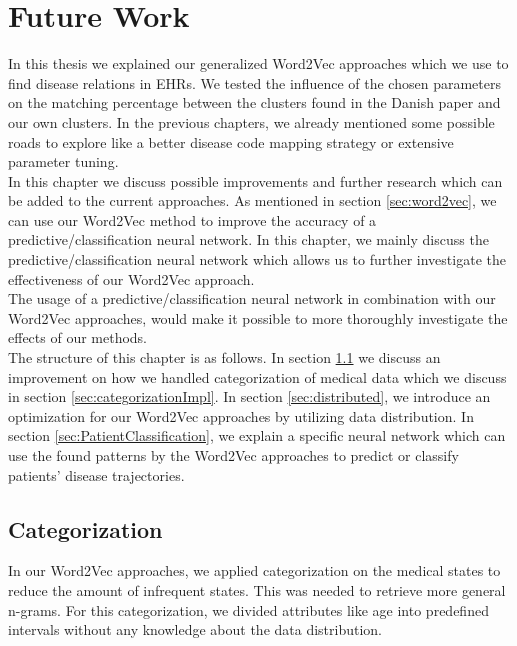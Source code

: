\graphicspath{ {FutureWork/Images/} }


\chapter{Future Work}
\label{cha:futureWork}

In this thesis we explained our generalized Word2Vec approaches which we use to find disease relations in EHRs. We tested the influence of the chosen parameters on the matching percentage between the clusters found in the Danish paper and our own clusters. In the previous chapters, we already mentioned some possible roads to explore like a better disease code mapping strategy or extensive parameter tuning. \\

In this chapter we discuss possible improvements and further research which can be added to the current approaches. As mentioned in section \ref{sec:word2vec}, we can use our Word2Vec method to improve the accuracy of a predictive/classification neural network. In this chapter, we mainly discuss the predictive/classification neural network which allows us to further investigate the effectiveness of our Word2Vec approach. \\
The usage of a predictive/classification neural network in combination with our Word2Vec approaches, would make it possible to more thoroughly investigate the effects of our methods. \\

The structure of this chapter is as follows. In section \ref{sec:categorization} we discuss an improvement on how we handled categorization of medical data which we discuss in section \ref{sec:categorizationImpl}. In section \ref{sec:distributed}, we introduce an optimization for our Word2Vec approaches by utilizing data distribution. In section \ref{sec:PatientClassification}, we explain a specific neural network which can use the found patterns by the Word2Vec approaches to predict or classify patients' disease trajectories.


\section{Categorization}
\label{sec:categorization}

In our Word2Vec approaches, we applied categorization on the medical states to reduce the amount of infrequent states. This was needed to retrieve more general n-grams. For this categorization, we divided attributes like age into predefined intervals without any knowledge about the data distribution. \\

